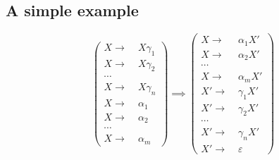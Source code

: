 \documentclass[10pt,a4paper,landscape]{article}
\begin{document}
\begin{multicols*}{3}
\section*{A simple example}
\[
\begin{pmatrix}
  X\to&\; X \gamma_1 \\
  X\to&\; X \gamma_2 \\
  \cdots             \\
  X\to&\; X \gamma_n \\
  X\to&\; \alpha_1   \\
  X\to&\; \alpha_2   \\
  \cdots             \\
  X\to&\; \alpha_m
\end{pmatrix}
\implies
\begin{pmatrix}
  X\to&\; \alpha_1 X' \\
  X\to&\; \alpha_2 X' \\
  \cdots             \\
  X\to&\; \alpha_m X' \\
  X'\to&\;\gamma_1 X' \\
  X'\to&\; \gamma_2 X' \\
  \cdots             \\
  X'\to&\; \gamma_n X' \\
  X'\to&\; \varepsilon
\end{pmatrix}
\]

\end{multicols*}
\end{document}
